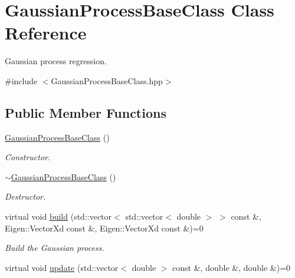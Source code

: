 \hypertarget{class_gaussian_process_base_class}{}\section{Gaussian\+Process\+Base\+Class Class Reference}
\label{class_gaussian_process_base_class}


Gaussian process regression.  




{\ttfamily \#include $<$Gaussian\+Process\+Base\+Class.\+hpp$>$}

\subsection*{Public Member Functions}
\begin{DoxyCompactItemize}
\item 
\hyperlink{class_gaussian_process_base_class_a8316a6a211d75577d5cbb241c523fc61}{Gaussian\+Process\+Base\+Class} ()\hypertarget{class_gaussian_process_base_class_a8316a6a211d75577d5cbb241c523fc61}{}\label{class_gaussian_process_base_class_a8316a6a211d75577d5cbb241c523fc61}

\begin{DoxyCompactList}\small\item\em Constructor. \end{DoxyCompactList}\item 
\hyperlink{class_gaussian_process_base_class_a26d5d0450741980b803ba7d0f36c8716}{$\sim$\+Gaussian\+Process\+Base\+Class} ()\hypertarget{class_gaussian_process_base_class_a26d5d0450741980b803ba7d0f36c8716}{}\label{class_gaussian_process_base_class_a26d5d0450741980b803ba7d0f36c8716}

\begin{DoxyCompactList}\small\item\em Destructor. \end{DoxyCompactList}\item 
virtual void \hyperlink{class_gaussian_process_base_class_aa77f0fbedc91e5ed840cdc6a59295d1c}{build} (std\+::vector$<$ std\+::vector$<$ double $>$ $>$ const \&, Eigen\+::\+Vector\+Xd const \&, Eigen\+::\+Vector\+Xd const \&)=0\hypertarget{class_gaussian_process_base_class_aa77f0fbedc91e5ed840cdc6a59295d1c}{}\label{class_gaussian_process_base_class_aa77f0fbedc91e5ed840cdc6a59295d1c}

\begin{DoxyCompactList}\small\item\em Build the Gaussian process. \end{DoxyCompactList}\item 
virtual void \hyperlink{class_gaussian_process_base_class_a889b7728135d6076a4854c165765e9d0}{update} (std\+::vector$<$ double $>$ const \&, double \&, double \&)=0\hypertarget{class_gaussian_process_base_class_a889b7728135d6076a4854c165765e9d0}{}\label{class_gaussian_process_base_class_a889b7728135d6076a4854c165765e9d0}


\end{DoxyCompactItemize}
